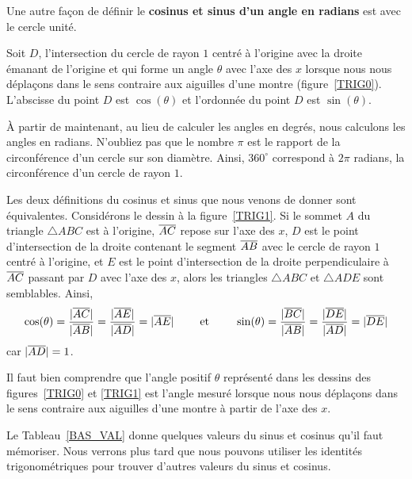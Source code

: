 {

Une autre façon de définir le
{\bfseries cosinus et sinus d'un angle en radians} est avec le cercle
unité.

\begin{focus}{\dfn}
Soit $D$, l'intersection du cercle de rayon $1$ centré à l'origine
avec la droite émanant de l'origine et qui forme un angle $\theta$
avec l'axe des $x$ lorsque nous nous déplaçons dans le sens contraire aux
aiguilles d'une montre (figure~\ref{TRIG0}).  L'abscisse du
point $D$ est $\cos(\theta)$ et l'ordonnée du point $D$
est $\sin(\theta)$.
\end{focus}


À partir de maintenant, au lieu de calculer les angles en degrés, nous
calculons les angles en radians.  N'oubliez pas que le nombre $\pi$
est le rapport de la circonférence d'un cercle sur son diamètre.
Ainsi,  $360^\circ$ correspond à $2\pi$ radians, la circonférence d'un
cercle de rayon $1$.

Les deux définitions du cosinus et sinus que nous venons de donner
sont équivalentes.  Considérons le dessin à la figure~\ref{TRIG1}.
Si le sommet $A$ du triangle $\triangle ABC$ est à l'origine,
$\overline{AC}$ repose sur l'axe des $x$, $D$ est le point d'intersection
de la droite contenant le segment $\overline{AB}$ avec le cercle de rayon
$1$ centré à l'origine, et $E$ est le point d'intersection de la
droite perpendiculaire à $\overline{AC}$ passant par $D$ avec l'axe des
$x$, alors les triangles $\triangle ABC$ et $\triangle ADE$ sont
semblables.  Ainsi,
\[
\cos(\theta) = \frac{|\overline{AC}|}{|\overline{AB}|} = \frac{|\overline{AE}|}{|\overline{AD}|} =
|\overline{AE}|
\qquad \text{ et } \qquad
\sin(\theta) = \frac{|\overline{BC}|}{|\overline{AB}|} = \frac{|\overline{DE}|}{|\overline{AD}|} =
|\overline{DE}|
\]
car $|\overline{AD}|=1$.

Il faut bien comprendre que l'angle positif $\theta$ représenté dans les
dessins des figures~\ref{TRIG0} et \ref{TRIG1} est l'angle mesuré lorsque nous
nous déplaçons dans le sens contraire aux aiguilles d'une montre à
partir de l'axe des $x$.

Le Tableau~\ref{BAS_VAL} donne quelques valeurs du sinus et cosinus
qu'il faut mémoriser.  Nous verrons plus tard que nous pouvons
utiliser les identités trigonométriques pour trouver d'autres valeurs
du sinus et cosinus.

}
